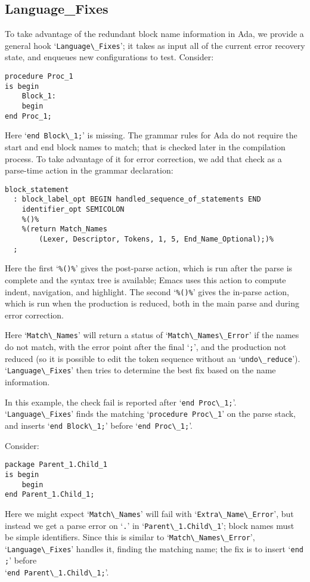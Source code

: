 \documentclass{article}
\newcommand{\code}[1]{`\lstinline|#1|'}
\begin{document}
\subsection{Language\_Fixes}
To take advantage of the redundant block name information in Ada, we
provide a general hook \code{Language\_Fixes}; it takes as input all of
the current error recovery state, and enqueues new configurations to
test.
Consider:
\begin{lstlisting}
procedure Proc_1
is begin
    Block_1:
    begin
end Proc_1;
\end{lstlisting}
Here \code{end Block\_1;} is missing. The grammar rules for Ada do not
require the start and end block names to match; that is checked later
in the compilation process. To take advantage of it for error
correction, we add that check as a parse-time action in the grammar
declaration:
\begin{verbatim}
block_statement
  : block_label_opt BEGIN handled_sequence_of_statements END
    identifier_opt SEMICOLON
    %()%
    %(return Match_Names
        (Lexer, Descriptor, Tokens, 1, 5, End_Name_Optional);)%
  ;
\end{verbatim}
Here the first `\verb|%()%|' gives the post-parse action, which is run
after the parse is complete and the syntax tree is available; Emacs
uses this action to compute indent, navigation, and highlight. The
second `\verb|%()%|' gives the in-parse action, which is run when the
production is reduced, both in the main parse and during error
correction.

Here \code{Match\_Names} will return a status of
\code{Match\_Names\_Error} if the names do not match, with the error
point after the final \code{;}, and the production not reduced (so it
is possible to edit the token sequence without an
\code{undo\_reduce}). \code{Language\_Fixes} then tries to determine
the best fix based on the name information.

In this example, the check fail is reported after \code{end Proc\_1;}.\\
\code{Language\_Fixes} finds the matching \code{procedure Proc\_1} on
the parse stack, and inserts \code{end Block\_1;} before
\code{end Proc\_1;}.

Consider:
\begin{lstlisting}
package Parent_1.Child_1
is begin
    begin
end Parent_1.Child_1;
\end{lstlisting}
Here we might expect \code{Match\_Names} will fail with
\code{Extra\_Name\_Error}, but instead we get a parse error on \code{.}
in \code{Parent\_1.Child\_1}; block names must be simple identifiers.
Since this is similar to \code{Match\_Names\_Error},
\code{Language\_Fixes} handles it, finding the matching name; the
fix is to insert \code{end ;} before\\ \code{end Parent\_1.Child\_1;}.
\end{document}
